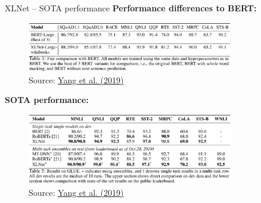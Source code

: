 \begin{frame}{XLNet -- SOTA performance}
\small
	\textbf{Performance differences to BERT:}

	\begin{figure}
		\centering
		\includegraphics[width = 9cm]{figure/xlnet-vs-bert.png}\\ 
		\footnotesize{Source:} \href{https://papers.nips.cc/paper/8812-xlnet-generalized-autoregressive-pretraining-for-language-understanding.pdf}{\footnotesize Yang et al. (2019)}
	\end{figure}

	\textbf{SOTA performance:}

	\begin{figure}
		\centering
		\includegraphics[width = 9cm]{figure/xlnet-sota.png}\\ 
		\footnotesize{Source:} \href{https://papers.nips.cc/paper/8812-xlnet-generalized-autoregressive-pretraining-for-language-understanding.pdf}{\footnotesize Yang et al. (2019)}
	\end{figure}
\end{frame}


\endlecture

